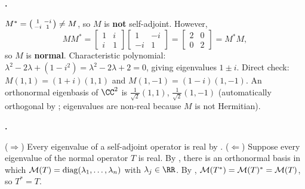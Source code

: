 \documentclass[10pt]{scrartcl}
\begin{document}
\begin{prob}
  \textbf{. }\par
  \begin{steps}
    \ii $M^*=\begin{psmallmatrix}1&-i\\-i&1\end{psmallmatrix}\neq M$, so $M$ is \textbf{not} self-adjoint. However,
    \[
      MM^* = \begin{bmatrix}1&i\\i&1\end{bmatrix}\begin{bmatrix}1&-i\\-i&1\end{bmatrix} = \begin{bmatrix}2&0\\0&2\end{bmatrix} = M^*M,
    \]
    so $M$ is \textbf{normal}.
    \ii Characteristic polynomial: $\lambda^2-2\lambda+(1-i^2)=\lambda^2-2\lambda+2=0$, giving eigenvalues $1\pm i$. Direct check: $M(1,1)=(1+i)(1,1)$ and $M(1,-1)=(1-i)(1,-1)$.
    \ii An orthonormal eigenbasis of $\CC^2$ is $\frac{1}{\sqrt{2}}(1,1)$, $\frac{1}{\sqrt{2}}(1,-1)$ (automatically orthogonal by ; eigenvalues are non-real because $M$ is not Hermitian).
  \end{steps}
\end{prob}

\begin{prob}
  \textbf{. }\par
  \begin{steps}
    \ii ($\Rightarrow$) Every eigenvalue of a self-adjoint operator is real by .
    \ii ($\Leftarrow$) Suppose every eigenvalue of the normal operator $T$ is real. By , there is an orthonormal basis in which $\mathcal M(T)=\operatorname{diag}(\lambda_1,\dots,\lambda_n)$ with $\lambda_j\in\RR$. By , $\mathcal M(T^*)=\mathcal M(T)^*=\mathcal M(T)$, so $T^*=T$.
  \end{steps}
\end{prob}
\end{document}
